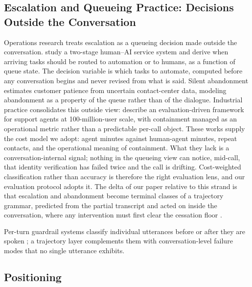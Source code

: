 \subsection{Escalation and Queueing Practice: Decisions Outside the Conversation}

Operations research treats escalation as a queueing decision made outside the conversation.
\citet{queuecontrol2026} study a two-stage human--AI service system and derive when arriving tasks should be routed to automation or to humans, as a function of queue state.
The decision variable is which tasks to automate, computed before any conversation begins and never revised from what is said.
Silent abandonment \citep{silentabandonment2024} estimates customer patience from uncertain contact-center data, modeling abandonment as a property of the queue rather than of the dialogue.
Industrial practice consolidates this outside view: \citet{nubank2026} describe an evaluation-driven framework for support agents at 100-million-user scale, with containment managed as an operational metric rather than a predictable per-call object.
These works supply the cost model we adopt: agent minutes against human-agent minutes, repeat contacts, and the operational meaning of containment.
What they lack is a conversation-internal signal; nothing in the queueing view can notice, mid-call, that identity verification has failed twice and the call is drifting.
Cost-weighted classification rather than accuracy is therefore the right evaluation lens, and our evaluation protocol adopts it.
The delta of our paper relative to this strand is that escalation and abandonment become terminal classes of a trajectory grammar, predicted from the partial transcript and acted on inside the conversation, where any intervention must first clear the cessation floor \citep{garcia2026cessationfloor}.

Per-turn guardrail systems classify individual utterances before or after they are spoken \citep{rebedea2023nemo,dong2024building}; a trajectory layer complements them with conversation-level failure modes that no single utterance exhibits.

\subsection{Positioning}


